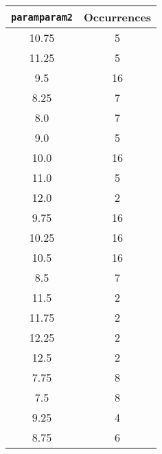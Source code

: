 \documentclass[letterpaper, 12pt]{article}
\begin{document}
\begin{longtable}{|c|c|}
\hline
\textbf{\texttt{paramparam2}} & \textbf{Occurrences} \\
\hline
10.75 & 5 \\
\hline
11.25 & 5 \\
\hline
9.5 & 16 \\
\hline
8.25 & 7 \\
\hline
8.0 & 7 \\
\hline
9.0 & 5 \\
\hline
10.0 & 16 \\
\hline
11.0 & 5 \\
\hline
12.0 & 2 \\
\hline
9.75 & 16 \\
\hline
10.25 & 16 \\
\hline
10.5 & 16 \\
\hline
8.5 & 7 \\
\hline
11.5 & 2 \\
\hline
11.75 & 2 \\
\hline
12.25 & 2 \\
\hline
12.5 & 2 \\
\hline
7.75 & 8 \\
\hline
7.5 & 8 \\
\hline
9.25 & 4 \\
\hline
8.75 & 6 \\
\hline
\end{longtable}
\end{document}
